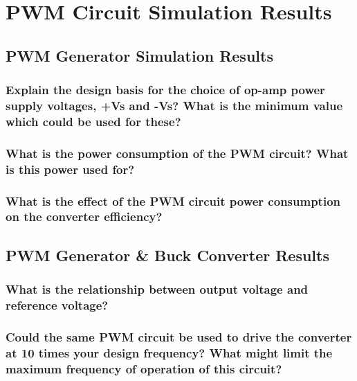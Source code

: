 \section{PWM Circuit Simulation Results}
\subsection{PWM Generator Simulation Results}
\subsubsection{Explain the design basis for the choice of op-amp power supply voltages, +Vs and -Vs? What is the minimum value which could be used for these?}

\subsubsection{What is the power consumption of the PWM circuit? What is this power used for?}

\subsubsection{What is the effect of the PWM circuit power consumption on the converter efficiency?}


\subsection{PWM Generator \& Buck Converter Results}

\subsubsection{What is the relationship between output voltage and reference voltage?}
\subsubsection{Could the same PWM circuit be used to drive the converter at 10 times your design frequency? What might limit the maximum frequency of operation of this circuit?}

